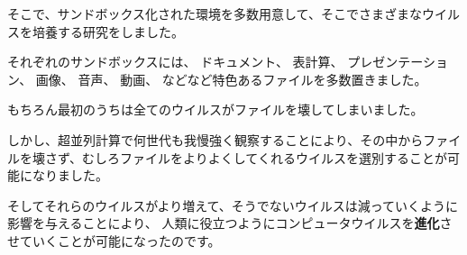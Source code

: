 \documentclass[12pt, unicode]{beamer}
\begin{document}
\begin{frame}

そこで、サンドボックス化された環境を多数用意して、そこでさまざまなウイルスを培養する研究をしました。

それぞれのサンドボックスには、
ドキュメント、
表計算、
プレゼンテーション、
画像、
音声、
動画、
などなど特色あるファイルを多数置きました。

\end{frame}
\begin{frame}

もちろん最初のうちは全てのウイルスがファイルを壊してしまいました。

しかし、超並列計算で何世代も我慢強く観察することにより、その中からファイルを壊さず、むしろファイルをよりよくしてくれるウイルスを選別することが可能になりました。

そしてそれらのウイルスがより増えて、そうでないウイルスは減っていくように影響を与えることにより、
人類に役立つようにコンピュータウイルスを\textbf{進化}させていくことが可能になったのです。

\end{frame}
\end{document}
